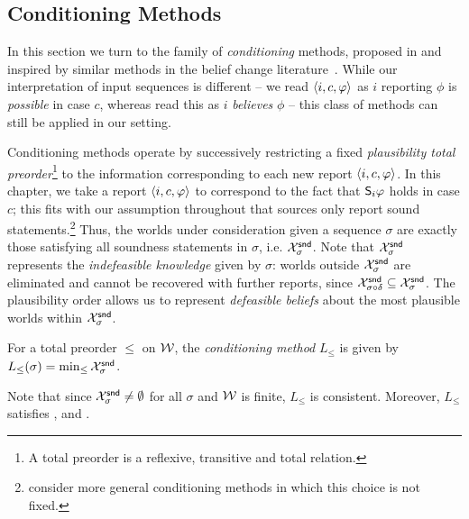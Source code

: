 \subsection{Conditioning Methods}

In this section we turn to the family of \emph{conditioning} methods, proposed
in \cite{singleton_booth_22_preprint} and inspired by similar methods in the
belief change literature~\cite{spohn1988ordinal}.
While our interpretation of input sequences is different -- we read $\tuple{i,
c, \phi}$ as $i$ reporting $\phi$ is \emph{possible} in case $c$, whereas
\textcite{singleton_booth_22_preprint} read this as $i$ \emph{believes} $\phi$ --
this class of methods can still be applied in our setting.

Conditioning methods operate by successively restricting a fixed
\emph{plausibility total preorder}\footnote{A total preorder is a reflexive,
transitive and total relation.} to the information corresponding to each
new report $\tuple{i, c, \phi}$. In this chapter, we take a report $\tuple{i, c,
\phi}$ to correspond to the fact that $\S_i\phi$ holds in case $c$; this fits
with our assumption throughout that sources only report sound
statements.\footnote{\textcite{singleton_booth_22_preprint} consider more general
conditioning methods in which this choice is not fixed.} Thus, the worlds under
consideration given a sequence $\sigma$ are exactly those satisfying all
soundness statements in $\sigma$, i.e. $\Xsnd_\sigma$. Note that $\Xsnd_\sigma$
represents the \emph{indefeasible knowledge} given by $\sigma$: worlds outside
$\Xsnd_\sigma$ are eliminated and cannot be recovered with further reports,
since $\Xsnd_{\sigma \seqappend \delta} \subseteq \Xsnd_\sigma$. The
plausibility order allows us to represent \emph{defeasible beliefs} about the
most plausible worlds within $\Xsnd_\sigma$.

\begin{definition}
    \label{def_conditioning_method}
    For a total preorder $\le$ on $\worlds$, the \emph{conditioning method}
    $L_{\le}$ is given by $L_{\le}(\sigma) = \min_{\le}{\Xsnd_\sigma}$.
\end{definition}

Note that since $\Xsnd_\sigma \ne \emptyset$ for all $\sigma$\footnotemark{}
and $\worlds$ is finite, $L_{\le}$ is consistent. Moreover, $L_{\le}$ satisfies
\equivalence{}, \repetition{} and \soundness{}.

